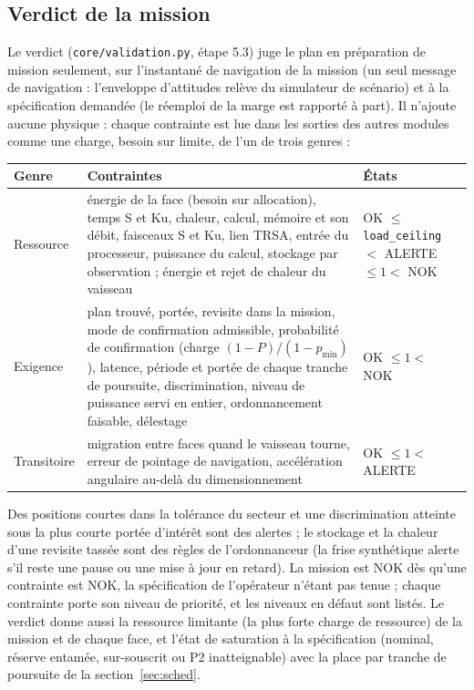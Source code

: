 \documentclass[11pt,a4paper]{article}
\newcommand{\code}[1]{\texttt{\small #1}}
\begin{document}
\subsection{Verdict de la mission}\label{sec:verdict}
Le verdict (\code{core/validation.py}, étape 5.3) juge le plan en préparation de mission seulement, sur l'instantané de
navigation de la mission (un seul message de navigation : l'enveloppe d'attitudes relève du simulateur de scénario) et à
la spécification demandée (le réemploi de la marge est rapporté à part). Il n'ajoute aucune physique : chaque contrainte
est lue dans les sorties des autres modules comme une charge, besoin sur limite, de l'un de trois genres :
\begin{center}
{\small\begin{tabularx}{\linewidth}{@{}lLl@{}}
\toprule
Genre & Contraintes & États\\
\midrule
Ressource & énergie de la face (besoin sur allocation), temps S et Ku, chaleur, calcul, mémoire et son débit, faisceaux S
et Ku, lien TRSA, entrée du processeur, puissance du calcul, stockage par observation ; énergie et rejet de chaleur du
vaisseau & OK $\le$ \code{load\_ceiling} $<$ ALERTE $\le 1 <$ NOK\\
Exigence & plan trouvé, portée, revisite dans la mission, mode de confirmation admissible, probabilité de confirmation
(charge $(1-P)/(1-p_\mathrm{min})$), latence, période et portée de chaque tranche de poursuite, discrimination, niveau
de puissance servi en entier, ordonnancement faisable, délestage & OK $\le 1 <$ NOK\\
Transitoire & migration entre faces quand le vaisseau tourne, erreur de pointage de navigation, accélération angulaire
au-delà du dimensionnement & OK $\le 1 <$ ALERTE\\
\bottomrule
\end{tabularx}}
\end{center}
Des positions courtes dans la tolérance du secteur et une discrimination atteinte sous la plus courte portée d'intérêt
sont des alertes ; le stockage et la chaleur d'une revisite tassée sont des règles de l'ordonnanceur (la frise
synthétique alerte s'il reste une pause ou une mise à jour en retard). La mission est NOK dès qu'une contrainte est NOK, la
spécification de l'opérateur n'étant pas tenue ; chaque contrainte porte son niveau de priorité, et les niveaux en défaut
sont listés. Le verdict donne aussi la ressource limitante (la plus forte charge de ressource) de la mission et de chaque
face, et l'état de saturation à la spécification (nominal, réserve entamée, sur-souscrit ou P2 inatteignable) avec la
place par tranche de poursuite de la section~\ref{sec:sched}.
\end{document}
